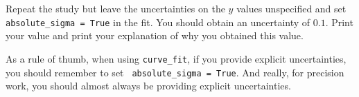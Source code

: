 \begin{print} Repeat the study but leave the uncertainties on the $y$ values
unspecified and set {\tt absolute{\_}sigma = True} in the fit.  You
should obtain an uncertainty of $0.1$.  Print your value and print your explanation of
why you obtained this value. \end{print}

As a rule of thumb, when using {\tt curve{\_}fit}, if you provide
explicit uncertainties, you should remember to set {\tt
  absolute{\_}sigma = True}.  And really, for precision work, you should
almost always be providing explicit uncertainties.


















